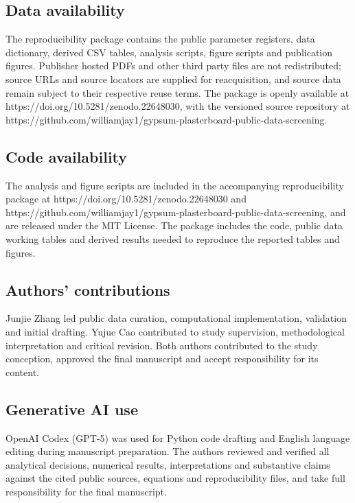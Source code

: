 \documentclass[pdflatex,sn-basic]{sn-jnl}
\begin{document}
\subsection*{Data availability}

The reproducibility package contains the public parameter registers, data dictionary, derived CSV tables, analysis scripts, figure scripts and publication figures. Publisher hosted PDFs and other third party files are not redistributed; source URLs and source locators are supplied for reacquisition, and source data remain subject to their respective reuse terms. The package is openly available at https://doi.org/10.5281/zenodo.22648030, with the versioned source repository at https://github.com/williamjay1/gypsum-plasterboard-public-data-screening.

\subsection*{Code availability}

The analysis and figure scripts are included in the accompanying reproducibility package at https://doi.org/10.5281/zenodo.22648030 and https://github.com/williamjay1/gypsum-plasterboard-public-data-screening, and are released under the MIT License. The package includes the code, public data working tables and derived results needed to reproduce the reported tables and figures.

\subsection*{Authors' contributions}

Junjie Zhang led public data curation, computational implementation, validation and initial drafting. Yujue Cao contributed to study supervision, methodological interpretation and critical revision. Both authors contributed to the study conception, approved the final manuscript and accept responsibility for its content.

\subsection*{Generative AI use}

OpenAI Codex (GPT-5) was used for Python code drafting and English language editing during manuscript preparation. The authors reviewed and verified all analytical decisions, numerical results, interpretations and substantive claims against the cited public sources, equations and reproducibility files, and take full responsibility for the final manuscript.
\end{document}
